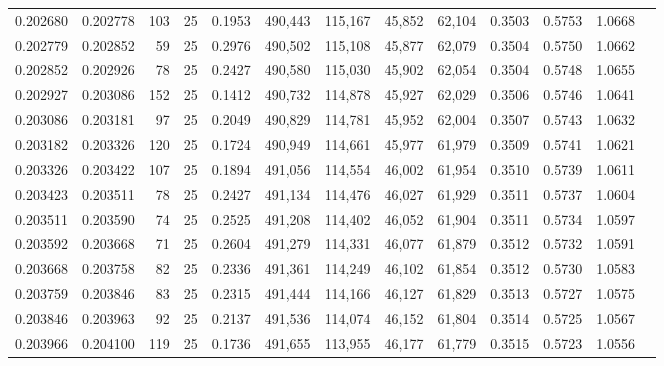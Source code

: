 \begin{tabular}{rrrrrrrrrrrrr}
0.202680 & 0.202778 &   103 &  25 &                                     0.1953 & 490,443 & 115,167 &  45,852 &  62,104 & 0.3503 & 0.5753 & 1.0668 \\
0.202779 & 0.202852 &    59 &  25 &                                     0.2976 & 490,502 & 115,108 &  45,877 &  62,079 & 0.3504 & 0.5750 & 1.0662 \\
0.202852 & 0.202926 &    78 &  25 &                                     0.2427 & 490,580 & 115,030 &  45,902 &  62,054 & 0.3504 & 0.5748 & 1.0655 \\
0.202927 & 0.203086 &   152 &  25 &                                     0.1412 & 490,732 & 114,878 &  45,927 &  62,029 & 0.3506 & 0.5746 & 1.0641 \\
0.203086 & 0.203181 &    97 &  25 &                                     0.2049 & 490,829 & 114,781 &  45,952 &  62,004 & 0.3507 & 0.5743 & 1.0632 \\
0.203182 & 0.203326 &   120 &  25 &                                     0.1724 & 490,949 & 114,661 &  45,977 &  61,979 & 0.3509 & 0.5741 & 1.0621 \\
0.203326 & 0.203422 &   107 &  25 &                                     0.1894 & 491,056 & 114,554 &  46,002 &  61,954 & 0.3510 & 0.5739 & 1.0611 \\
0.203423 & 0.203511 &    78 &  25 &                                     0.2427 & 491,134 & 114,476 &  46,027 &  61,929 & 0.3511 & 0.5737 & 1.0604 \\
0.203511 & 0.203590 &    74 &  25 &                                     0.2525 & 491,208 & 114,402 &  46,052 &  61,904 & 0.3511 & 0.5734 & 1.0597 \\
0.203592 & 0.203668 &    71 &  25 &                                     0.2604 & 491,279 & 114,331 &  46,077 &  61,879 & 0.3512 & 0.5732 & 1.0591 \\
0.203668 & 0.203758 &    82 &  25 &                                     0.2336 & 491,361 & 114,249 &  46,102 &  61,854 & 0.3512 & 0.5730 & 1.0583 \\
0.203759 & 0.203846 &    83 &  25 &                                     0.2315 & 491,444 & 114,166 &  46,127 &  61,829 & 0.3513 & 0.5727 & 1.0575 \\
0.203846 & 0.203963 &    92 &  25 &                                     0.2137 & 491,536 & 114,074 &  46,152 &  61,804 & 0.3514 & 0.5725 & 1.0567 \\
0.203966 & 0.204100 &   119 &  25 &                                     0.1736 & 491,655 & 113,955 &  46,177 &  61,779 & 0.3515 & 0.5723 & 1.0556 \\

\end{tabular}
